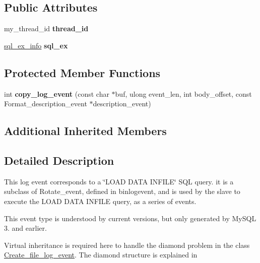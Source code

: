 \subsection*{Public Attributes}
\begin{DoxyCompactItemize}
\item 
\mbox{\label{classLoad__log__event_a7e713e776cd3666a38ba3b45fcafee0a}} 
my\+\_\+thread\+\_\+id {\bfseries thread\+\_\+id}
\item 
\mbox{\label{classLoad__log__event_ad7b68633f5b2d583175adf299bf71d38}} 
\mbox{\hyperlink{structsql__ex__info}{sql\+\_\+ex\+\_\+info}} {\bfseries sql\+\_\+ex}
\end{DoxyCompactItemize}
\subsection*{Protected Member Functions}
\begin{DoxyCompactItemize}
\item 
\mbox{\label{classLoad__log__event_a9edc421165b3f950d0a5e2e1b0c23ee8}} 
int {\bfseries copy\+\_\+log\+\_\+event} (const char $\ast$buf, ulong event\+\_\+len, int body\+\_\+offset, const Format\+\_\+description\+\_\+event $\ast$description\+\_\+event)
\end{DoxyCompactItemize}
\subsection*{Additional Inherited Members}


\subsection{Detailed Description}
This log event corresponds to a \char`\"{}\+L\+O\+A\+D D\+A\+T\+A I\+N\+F\+I\+L\+E\char`\"{} S\+QL query. it is a subclass of Rotate\+\_\+event, defined in binlogevent, and is used by the slave to execute the L\+O\+AD D\+A\+TA I\+N\+F\+I\+LE query, as a series of events.

This event type is understood by current versions, but only generated by My\+S\+QL 3. and earlier.

Virtual inheritance is required here to handle the diamond problem in the class \mbox{\hyperlink{classCreate__file__log__event}{Create\+\_\+file\+\_\+log\+\_\+event}}. The diamond structure is explained in  


